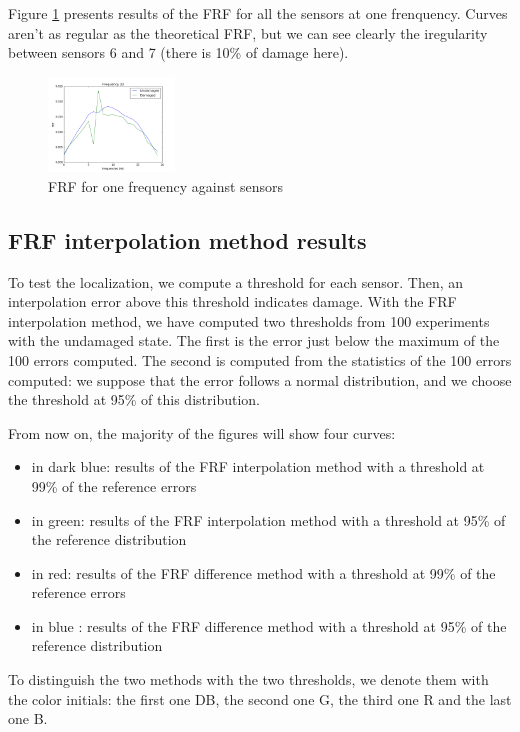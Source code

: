 \documentclass[journal]{IEEEtran}
\begin{document}
Figure \ref{frf_sensors} presents results of the FRF for all the sensors at one frenquency. Curves aren't as regular as the theoretical FRF, but we can see clearly the iregularity between sensors 6 and 7 (there is 10\% of damage here).


\begin{figure}[h!]
  \centering
  \includegraphics[width=0.3\textwidth]{images/frf_one_frequency.png}
  \caption{FRF for one frequency against sensors}
  \label{frf_sensors}
\end{figure}


\subsection{FRF interpolation method results}

To test the localization, we compute a threshold for each sensor. Then, an interpolation error above this threshold indicates damage. With the FRF interpolation method, we have computed two thresholds from 100 experiments with the undamaged state. The first is the error just below the maximum of the 100 errors computed. The second is computed from the statistics of the 100 errors computed: we suppose that the error follows a normal distribution, and we choose the threshold at 95\% of this distribution.

From now on, the majority of the figures will show four curves:
\begin{itemize}
\item in dark blue: results of the FRF interpolation method with a threshold at 99\% of the reference errors
\item in green: results of the FRF interpolation method with a threshold at 95\% of the reference distribution
\item in red: results of the FRF difference method with a threshold at 99\% of the reference errors
\item in blue : results of the FRF difference method with a threshold at 95\% of the reference distribution
\end{itemize}

To distinguish the two methods with the two thresholds, we denote them with the color initials: the first one DB, the second one G, the third one R and the last one B.
\end{document}
